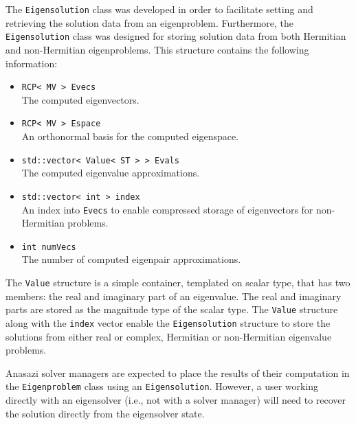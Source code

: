 \documentclass[acmtoms]{acmtrans2m}
\newcommand{\aspace}[1]{\texttt{#1}}
\begin{document}
The \aspace{Eigensolution} class was developed in order to
facilitate setting and retrieving the solution data from an eigenproblem.  
Furthermore, the \aspace{Eigensolution} class was designed for storing
solution data from both Hermitian and non-Hermitian eigenproblems. 
This structure contains the following information:
\begin{itemize}
  \item \verb!RCP< MV > Evecs! \\
   The computed eigenvectors.
 \item \verb!RCP< MV > Espace! \\
   An orthonormal basis for the computed eigenspace.
 \item \verb!std::vector< Value< ST > > Evals! \\
   The computed eigenvalue approximations.
 \item \verb!std::vector< int > index! \\
   An index into \verb!Evecs! to enable compressed storage of eigenvectors for non-Hermitian problems.
 \item \verb!int numVecs! \\
   The number of computed eigenpair approximations.
\end{itemize}
The \aspace{Value} structure is a simple container, templated on scalar type, that
has two members: the real and imaginary part of an eigenvalue.  The real and imaginary
parts are stored as the magnitude type of the scalar type.  The \aspace{Value} structure
along with the \verb!index! vector enable the \aspace{Eigensolution} structure to 
store the solutions from either real or complex, Hermitian or non-Hermitian eigenvalue
problems.

Anasazi solver managers are expected to place the results of their computation in the
\aspace{Eigenproblem} class using an \aspace{Eigensolution}. However, a user working
directly with an eigensolver (i.e., not with a solver manager) will need to recover the
solution directly from the eigensolver state.

\end{document}
